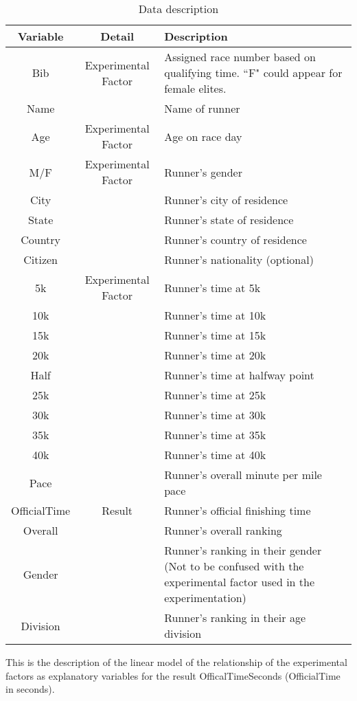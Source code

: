 \documentclass[11pt, oneside]{article}   	%
\begin{document}
\begin{table}[H]
\caption{Data description}
 \begin{tabularx}{\columnwidth}{|c|c|X|}
 \hline
  Variable & Detail & Description\\ 
  \hline \hline
   Bib & Experimental Factor & Assigned race number based on qualifying time. ``F" could appear for female elites.\\
   Name & & Name of runner\\
   Age & Experimental Factor & Age on race day\\
   M/F & Experimental Factor & Runner's gender\\
   City & & Runner's city of residence\\
   State & & Runner's state of residence\\
   Country & & Runner's country of residence\\
   Citizen & & Runner's nationality (optional)\\
   5k & Experimental Factor & Runner's time at 5k\\
   10k & & Runner's time at 10k\\
   15k & & Runner's time at 15k\\
   20k & & Runner's time at 20k\\
   Half & & Runner's time at halfway point\\
    25k & & Runner's time at 25k\\
     30k & & Runner's time at 30k\\
     35k & & Runner's time at 35k\\
40k & & Runner's time at 40k\\
 Pace & & Runner's overall minute per mile pace\\
 OfficialTime & Result & Runner's official finishing time\\
 Overall &  & Runner's overall ranking\\
 Gender &  & Runner's ranking in their gender (Not to be confused with the experimental factor used in the experimentation)\\
 Division &  & Runner's ranking in their age division\\
 \hline
\end{tabularx}
\label{table: data description}
\end{table}

This is the description of the linear model of the relationship of the experimental factors as explanatory variables for the result OfficalTimeSeconds (OfficialTime in seconds).\\
\end{document}
